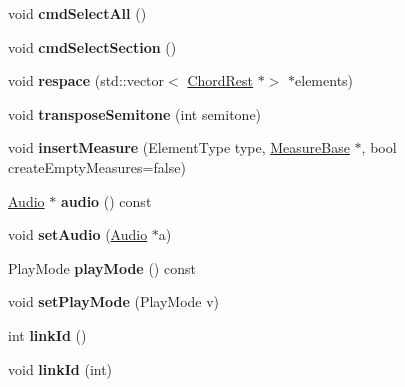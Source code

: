 \begin{DoxyCompactItemize}
void {\bfseries cmd\+Select\+All} ()
\item 
\mbox{\label{class_ms_1_1_score_a96abc755f1344422a20c67ec190d8c3f}} 
void {\bfseries cmd\+Select\+Section} ()
\item 
\mbox{\label{class_ms_1_1_score_a5dc40137cd531f03daad7bdca7ab68e6}} 
void {\bfseries respace} (std\+::vector$<$ \hyperlink{class_ms_1_1_chord_rest}{Chord\+Rest} $\ast$$>$ $\ast$elements)
\item 
\mbox{\label{class_ms_1_1_score_a88af620e956ef066f3d33c71d0564b63}} 
void {\bfseries transpose\+Semitone} (int semitone)
\item 
\mbox{\label{class_ms_1_1_score_ac95fe1624625a906014772dd2d3421e9}} 
void {\bfseries insert\+Measure} (Element\+Type type, \hyperlink{class_ms_1_1_measure_base}{Measure\+Base} $\ast$, bool create\+Empty\+Measures=false)
\item 
\mbox{\label{class_ms_1_1_score_aa2628219dfb18c317f684c4a2e3e025f}} 
\hyperlink{class_ms_1_1_audio}{Audio} $\ast$ {\bfseries audio} () const
\item 
\mbox{\label{class_ms_1_1_score_a29fa428537a44ec8e65cc2c1a73de55b}} 
void {\bfseries set\+Audio} (\hyperlink{class_ms_1_1_audio}{Audio} $\ast$a)
\item 
\mbox{\label{class_ms_1_1_score_a0cd52a6186e4d365406c36843bba414b}} 
Play\+Mode {\bfseries play\+Mode} () const
\item 
\mbox{\label{class_ms_1_1_score_a59c9340fe7f8877da3afb5e28da661b4}} 
void {\bfseries set\+Play\+Mode} (Play\+Mode v)
\item 
\mbox{\label{class_ms_1_1_score_a72dca0fa1de8bf4cc0e5107313f29048}} 
int {\bfseries link\+Id} ()
\item 
\mbox{\label{class_ms_1_1_score_ad8a87b2137e53382685385d7593265ad}} 
void {\bfseries link\+Id} (int)
\item 
\mbox{\label{class_ms_1_1_score_aed33fb2e90c8e92209edb8f336dca32a}} 
$$
\end{DoxyCompactItemize}
